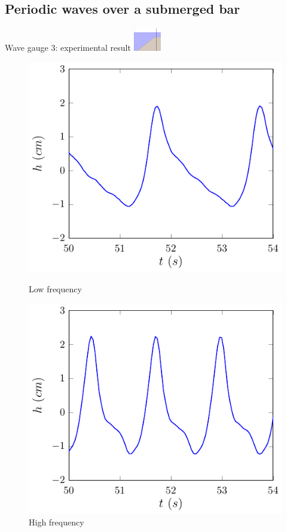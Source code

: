 \documentclass[pdf]{beamer}
\begin{document}
\subsection{Periodic waves over a submerged bar}
\begin{frame}{Wave gauge 3: experimental result \space\space	\includegraphics[width=1.2cm]{./Pics/WT3z.pdf}  }
	\begin{figure}
		\centering
		\begin{minipage}{.5\textwidth}
			\centering
			\includegraphics[width=0.9\linewidth]{./Pics/SL/WG3/1e-figure0.pdf}
			\caption{Low frequency}
		\end{minipage}%
		\begin{minipage}{.5\textwidth}
			\centering
			\includegraphics[width=0.9\linewidth]{./Pics/SH/WG3/1e-figure0.pdf}
			\caption{High frequency}
		\end{minipage}
	\end{figure}
\end{frame}
\end{document}
